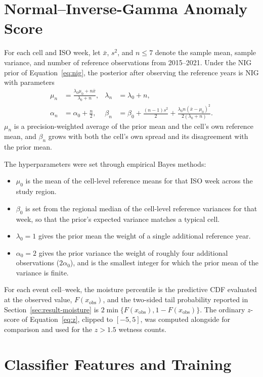 \documentclass[10pt,letterpaper]{article}
\begin{document}
\section{Normal--Inverse-Gamma Anomaly Score}\label{app:nig}
For each cell and ISO week, let $\bar{x}$, $s^2$, and $n\leq7$ denote the sample mean, sample variance, and number of reference observations from 2015--2021. Under the NIG prior of Equation~\ref{eq:nig}, the posterior after observing the reference years is NIG with parameters \citep{murphy2007conjugate}
\begin{align}
\mu_n&=\frac{\lambda_0\mu_0+n\bar{x}}{\lambda_0+n}, & \lambda_n&=\lambda_0+n,\label{eq:nig-mean}\\
\alpha_n&=\alpha_0+\frac{n}{2}, & \beta_n&=\beta_0+\frac{(n-1)s^2}{2}+\frac{\lambda_0n(\bar{x}-\mu_0)^2}{2(\lambda_0+n)}.\label{eq:nig-var}
\end{align}
$\mu_n$ is a precision-weighted average of the prior mean and the cell's own reference mean, and $\beta_n$ grows with both the cell's own spread and its disagreement with the prior mean.

The hyperparameters were set through empirical Bayes methods:
\begin{itemize}
\item $\mu_0$ is the mean of the cell-level reference means for that ISO week across the study region.
\item $\beta_0$ is set from the regional median of the cell-level reference variances for that week, so that the prior's expected variance matches a typical cell.
\item $\lambda_0=1$ gives the prior mean the weight of a single additional reference year.
\item $\alpha_0=2$ gives the prior variance the weight of roughly four additional observations ($2\alpha_0$), and is the smallest integer for which the prior mean of the variance is finite.
\end{itemize}
For each event cell--week, the moisture percentile is the predictive CDF evaluated at the observed value, $F(x_{\mathrm{obs}})$, and the two-sided tail probability reported in Section~\ref{sec:result-moisture} is $2\min\{F(x_{\mathrm{obs}}),1-F(x_{\mathrm{obs}})\}$. The ordinary $z$-score of Equation~\ref{eq:z}, clipped to $[-5,5]$, was computed alongside for comparison and used for the $z>1.5$ wetness counts.

\section{Classifier Features and Training}\label{app:classifier}
\end{document}
